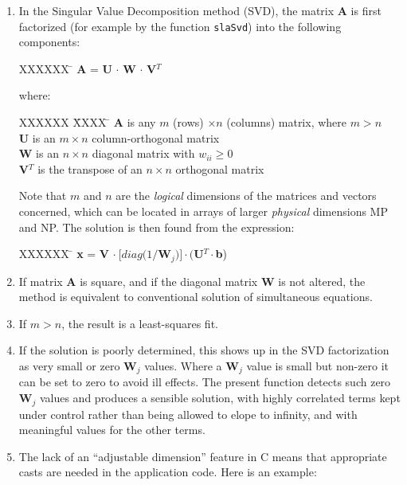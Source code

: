 \documentclass[11pt,fleqn,twoside]{article}
\renewcommand{\_}{{\tt\char'137}}     %
\begin{document}
{
 \begin{enumerate}
  \item In the Singular Value Decomposition method (SVD),
        the matrix {\bf A} is first factorized (for example by
        the function {\tt slaSvd}) into the following components:
        \begin{tabbing}
        XXXXXX \= \kill
        \> {\bf A} = {\bf U} $\cdot$ {\bf W} $\cdot$ {\bf V}$^{T}$
        \end{tabbing}
        where:
        \begin{tabbing}
        XXXXXX \= XXXX \= \kill
        \> {\bf A} \> is any $m$ (rows) $\times n$ (columns) matrix,
                      where $m > n$ \\
        \> {\bf U} \> is an $m \times n$ column-orthogonal matrix \\
        \> {\bf W} \> is an $n \times n$ diagonal matrix with
                      $w_{ii} \geq 0$ \\
        \> {\bf V}$^{T}$ \> is the transpose of an $n \times n$
                            orthogonal matrix
        \end{tabbing}
        Note that $m$ and $n$ are the {\it logical}\/ dimensions of the
        matrices and vectors concerned, which can be located in
        arrays of larger {\it physical}\/ dimensions MP and NP.
        The solution is then found from the expression:
        \begin{tabbing}
        XXXXXX \= \kill
        \> {\bf x} = {\bf V} $\cdot~[diag(1/${\bf W}$_{j})]
           \cdot (${\bf U}$^{T} \cdot${\bf b})
        \end{tabbing}
  \item If matrix {\bf A} is square, and if the diagonal matrix {\bf W} is not
        altered, the method is equivalent to conventional solution
        of simultaneous equations.
  \item If $m > n$, the result is a least-squares fit.
  \item If the solution is poorly determined, this shows up in the
        SVD factorization as very small or zero {\bf W}$_{j}$ values.  Where
        a {\bf W}$_{j}$ value is small but non-zero it can be set to zero to
        avoid ill effects.  The present function detects such zero
        {\bf W}$_{j}$ values and produces a sensible solution, with highly
        correlated terms kept under control rather than being allowed
        to elope to infinity, and with meaningful values for the
        other terms.
  \item The lack of an ``adjustable dimension'' feature in C means that
        appropriate casts are needed in the application code.  Here is
        an example:
 \end{enumerate}
}
\end{document}

